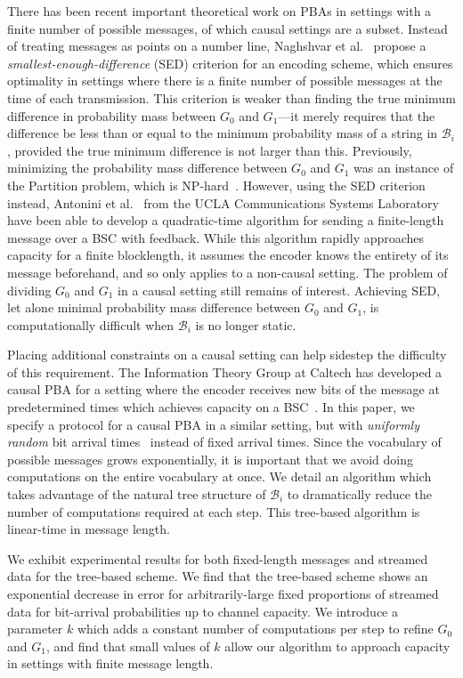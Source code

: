 \documentclass{IEEEtran}
\begin{document}
There has been recent important
theoretical work on PBAs in settings with a finite number of possible
messages, of which causal settings are a subset.
Instead of treating messages as points on a number line,
Naghshvar et al.~\cite{javidiextrinsic} propose a
\textit{smallest-enough-difference} (SED) criterion for an
encoding scheme, which ensures optimality in settings where there is a
finite number of possible messages at the time of each transmission. This
criterion is weaker than finding the true minimum difference in probability
mass between $G_0$ and $G_1$---it merely requires that the difference be
less than or equal to the minimum probability mass of a string in
$\mathcal{B}_i$,
provided the true minimum difference is not larger than this. Previously,
minimizing the probability mass difference between $G_0$ and $G_1$ was an
instance of the Partition problem, which is NP-hard~\cite{karpnp}. However,
using the SED criterion instead, Antonini et al.~\cite{antoninilow}
from the UCLA Communications Systems Laboratory have been able to develop
a quadratic-time algorithm for sending a finite-length message over a BSC
with feedback. While this algorithm rapidly approaches capacity
for a finite blocklength,
it assumes the encoder knows the entirety of its message beforehand, and so
only applies to a non-causal setting. The problem of dividing $G_0$ and $G_1$ in
a causal setting still remains of interest. Achieving SED, let alone minimal
probability mass difference between $G_0$ and $G_1$, is computationally
difficult when $\mathcal{B}_i$ is no longer static.

Placing additional constraints on a causal setting can help sidestep
the difficulty of this requirement.
The Information Theory Group at Caltech has developed a
causal PBA for a setting where the encoder receives new bits
of the message at predetermined times which achieves
capacity on a BSC~\cite{lalithareal}. In this paper, we specify a protocol
for a causal PBA
in a similar setting, but with \textit{uniformly random} bit arrival
times~\cite{guosed} instead of fixed arrival times. Since the
vocabulary of possible messages grows exponentially, it is
important that we avoid doing computations on the entire vocabulary
at once. We detail an
algorithm which takes advantage
of the natural tree structure of $\mathcal{B}_i$ to dramatically reduce
the number of computations required at each step.
This tree-based algorithm is linear-time in message length.

We exhibit experimental results for
both fixed-length messages
and streamed data for the tree-based scheme. We find that
the tree-based scheme shows an exponential
decrease in error for arbitrarily-large fixed proportions of streamed
data for bit-arrival probabilities up to channel capacity. We introduce
a parameter $k$ which adds a constant number of computations per step
to refine $G_0$ and $G_1$, and find that small values of $k$ allow our
algorithm to approach capacity in settings with finite message length.
\end{document}
